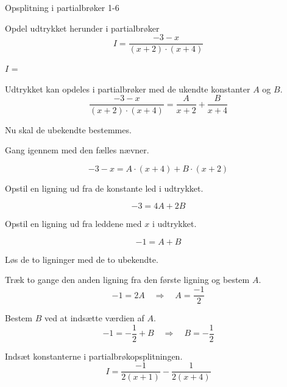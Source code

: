 \documentclass{article}
\begin{document}
\begin{exercise}{Opsplitning i partialbrøker 1-6}
	
	Opdel udtrykket herunder i partialbrøker
	\[
	I = \frac{-3 - x}{(x + 2) \cdot (x + 4)}
	\]
	
	$I$ =  
	
	\hint
	Udtrykket kan opdeles i partialbrøker med de ukendte konstanter $A$ og $B$.
	\[
	\frac{-3 - x}{(x + 2) \cdot (x + 4)} = 
	\frac{A}{x + 2} + \frac{B}{x + 4}
	\]
	
	\hint
	Nu skal de ubekendte bestemmes.
	
	\hint
	Gang igennem med den fælles nævner.
	
	\hint
	\[
	-3 - x = A \cdot (x + 4) + B \cdot (x + 2)
	\]
	
	\hint
	Opstil en ligning ud fra de konstante led i udtrykket.
	
	\hint
	\[
	-3 = 4A+ 2B
	\]
	
	\hint
	Opstil en ligning ud fra leddene med $x$ i udtrykket.
	
	\hint
	\[
	-1 = A + B
	\]
	
	\hint
	Løs de to ligninger med de to ubekendte.
	
	\hint
	Træk to gange den anden ligning fra den første ligning og bestem $A$.
	\[
	-1 = 2A \quad	\Rightarrow		\quad		A = \frac{-1}{2}
	\]
	
	\hint
	Bestem $B$ ved at indsætte værdien af $A$.
	\[
	-1 =  -\frac{1}{2} + B \quad 	\Rightarrow		\quad B = -\frac{1}{2}
	\]
	
	\hint
	Indsæt konstanterne i partialbrøkopsplitningen.
	\[
	I = \frac{-1}{2(x+1)} - \frac{1}{2(x+4)}
	\]
	
	
	
\end{exercise}
\end{document}
